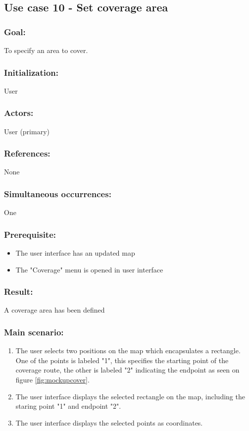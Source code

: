 \begin{framed}
	\subsection{Use case 10 - Set coverage area}
	\subsubsection*{Goal:}
	To specify an area to cover.
	
	\subsubsection*{Initialization:}
	User
	
	\subsubsection*{Actors:}
	User (primary)
	
	\subsubsection*{References:}
	None
	
	\subsubsection*{Simultaneous occurrences:}
	One
	
	\subsubsection*{Prerequisite:}
	\begin{itemize}
		\item The user interface has an updated map
		\item The "Coverage" menu is opened in user interface
	\end{itemize}
	
	\subsubsection*{Result:}
	A coverage area has been defined
	
	\subsubsection*{Main scenario:}
	\begin{enumerate}
		\item The user selects two positions on the map which encapsulates a rectangle. One of the points is labeled "1", this specifies the starting point of the coverage route, the other is labeled "2" indicating the endpoint as seen on figure \ref{fig:mockupcover}.
		\item \label{uc10.2} The user interface displays the selected rectangle on the map, including the staring point "1" and endpoint "2".
		\item The user interface displays the selected points as coordinates.
	\end{enumerate}	
	

\end{framed}
